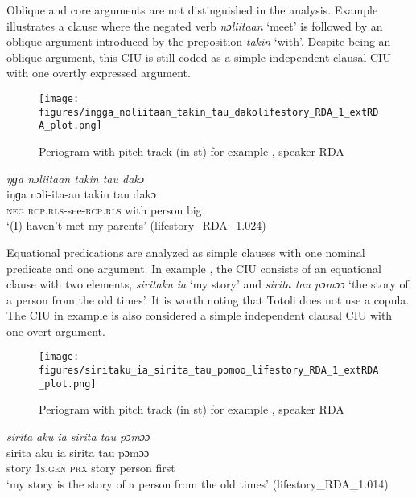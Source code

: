 Oblique and core arguments are not distinguished in the analysis. Example  illustrates a clause where the negated verb \textit{nɔliitaan} `meet' is followed by an oblique argument introduced by the preposition \textit{takin} `with'. Despite being an oblique argument, this CIU is still coded as a simple independent clausal CIU with one overtly expressed argument.

\begin{figure}
	\texttt{[image: figures/ingga\_noliitaan\_takin\_tau\_dakolifestory\_RDA\_1\_extRDA\_plot.png]}
	\caption{Periogram with pitch track (in st) for example , speaker RDA}
	\label{pitch:ngga noliitaan takin tau dako}
\end{figure}




\ea
\label{ex:ngga noliitaan takin tau dako}
\textit{ŋɡa nɔliitaan takin tau dakɔ} \\
\gll iŋɡa {nɔli-}ita{-an} takin tau dakɔ\\ 
\textsc{neg} \textsc{rcp.rls-}see\textsc{-rcp.rls} with person big\\
\glt ‘(I) haven't met my parents’ \hfill(lifestory\_RDA\_1.024)
\z



Equational predications are analyzed as simple clauses with one nominal predicate and one argument. In example , the CIU consists of an equational clause with two elements, \textit{siritaku ia} `my story' and \textit{sirita tau pɔmɔɔ} `the story of a person from the old times'. It is worth noting that Totoli does not use a copula. The CIU in example  is also considered a simple independent clausal CIU with one overt argument.


\begin{figure}
	\texttt{[image: figures/siritaku\_ia\_sirita\_tau\_pomoo\_lifestory\_RDA\_1\_extRDA\_plot.png]}
	\caption{Periogram with pitch track (in st) for example , speaker RDA}
	\label{pitch:siritaku ia sirita tau pomoo}
\end{figure}




\newpage
\ea
\label{ex:siritaku ia sirita tau pomoo}
\textit{sirita aku ia sirita tau pɔmɔɔ} \\
\gll sirita aku ia sirita tau pɔmɔɔ\\ 
story 1\textsc{s}\textsc{.gen} \textsc{prx} story person first\\
\glt ‘my story is the story of a person from the old times’ \hfill(lifestory\_RDA\_1.014)
\z


